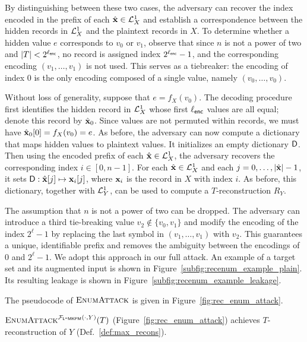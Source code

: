 By distinguishing between these two cases, the adversary can recover the index
encoded in the prefix of each $\hat{\mathbf{x}} \in \mathcal{L}^{1}_X$ and establish a correspondence
between the hidden records in $\mathcal{L}^{1}_X$ and the plaintext records in $X$. To
determine whether a hidden value $e$ corresponds to $v_0$ or $v_1$, observe that
since $n$ is not a power of two and $|T| < 2^{\ell_{\mathsf{enc}}}$, no record is assigned
index $2^{\ell_{\mathsf{enc}}} - 1$, and the corresponding encoding $(v_1,\ldots,v_1)$ is not
used. This serves as a tiebreaker: the encoding of index $0$ is the only
encoding composed of a single value, namely $(v_0,\ldots,v_0)$.

Without loss of generality, suppose that $e = f_X(v_0)$. The decoding procedure
first identifies the hidden record in $\mathcal{L}^{1}_X$ whose first $\ell_{\mathsf{enc}}$ values are
all equal; denote this record by $\hat{\mathbf{x}}_0$. Since values are not permuted within
records, we must have $\hat{\mathbf{x}}_0[0] = f_X(v_0) = e$. As before, the adversary can
now compute a dictionary that maps hidden values to plaintext values. It
initializes an empty dictionary $\mathsf{D}$.  Then using the encoded prefix of each
$\hat{\mathbf{x}} \in \mathcal{L}^{1}_X$, the adversary recovers the corresponding index
$i \in [0,n-1]$. For each $\hat{\mathbf{x}} \in \mathcal{L}^{1}_X$ and each $j = 0,\dots,|\hat{\mathbf{x}}|-1$, it
sets $\mathsf{D} : \hat{\mathbf{x}}[j] \mapsto \mathbf{x}_i[j]$, where $\mathbf{x}_i$ is the record in $X$ with
index $i$. As before, this dictionary, together with $\mathcal{L}^{1}_Y$, can be used to
compute a $T$-reconstruction $R_Y$.


The assumption that $n$ is not a power of two can be dropped. The adversary can
introduce a third tie-breaking value $v_2 \notin \{v_0,v_1\}$ and modify the
encoding of the index $2^\ell - 1$ by replacing the last symbol in
$(v_1,\ldots,v_1)$ with $v_2$. This guarantees a unique, identifiable prefix and
removes the ambiguity between the encodings of $0$ and $2^\ell - 1$. We adopt
this approach in our full attack.  An example of a target set and its augmented
input is shown in Figure~\ref{subfig:recenum_example_plain}. Its resulting
leakage is shown in Figure~\ref{subfig:recenum_example_leakage}.

The pseudocode of $\textsc{EnumAttack}$ is given in Figure~\ref{fig:rec_enum_attack}.

\begin{theorem}\label{thm:recenumattack:correctness}
  $\textsc{EnumAttack}^{\mathcal{F}_{\mathsf{L\mbox{-}MKPM}}(\cdot, Y)}(T)$
  (Figure~\ref{fig:rec_enum_attack}) achieves $T$-reconstruction of $Y$
  (Def.~\ref{def:max_recons}).
\end{theorem}

